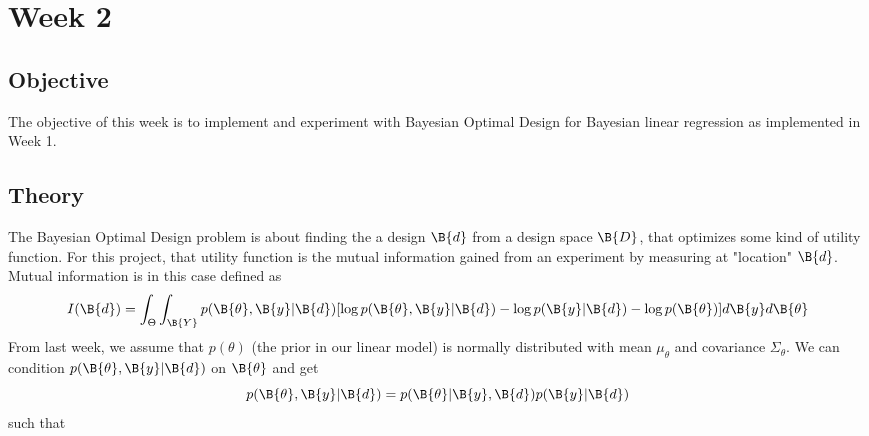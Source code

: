 \section{Week 2}
\subsection{Objective}
The objective of this week is to implement and experiment with Bayesian Optimal Design for Bayesian linear regression
as implemented in Week 1.
\subsection{Theory}
The Bayesian Optimal Design problem is about finding the a design $\B{d}$ from a design space $\B{D}$, that optimizes some kind of utility function.
For this project, that utility function is the mutual information gained from an experiment by measuring at "location" $\B{d}$.\\
Mutual information is in this case defined as
$$I(\B{d}) = \int_{\Theta}\int_{\B{Y}}p(\B{\theta}, \B{y}|\B{d})[\log p(\B{\theta}, \B{y}|\B{d}) - \log p(\B{y}|\B{d}) - \log p(\B{\theta})]d\B{y}d\B{\theta}$$
From last week, we assume that $p(\theta)$ (the prior in our linear model) is normally distributed with mean $\mu_\theta$ and covariance $\Sigma_\theta$.
We can condition $p(\B{\theta}, \B{y}|\B{d})$ on $\B{\theta}$ and get
$$p(\B{\theta}, \B{y}|\B{d}) = p(\B{\theta}|\B{y}, \B{d})p(\B{y}|\B{d})$$
such that 

